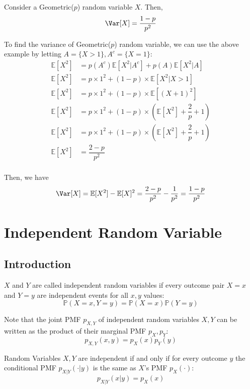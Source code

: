 Consider a Geometric(\(p\)) random variable \(X\). Then,
\[
    \Var[X] = \dfrac{1 - p}{p^{2}}
\]

\newpage
To find the variance of Geometric(\(p\)) random variable, we can use the above example by letting \(A = \{X > 1\}, A^c = \{X = 1\}\):
\[
\begin{aligned}
    \mathbb{E}[X^2] &= p(A^c)\mathbb{E}[X^2 \vert A^c] + p(A)\mathbb{E}[X^2 \vert A] \\
    \mathbb{E}[X^2] &= p \times 1^2 + (1 - p) \times \mathbb{E}[X^2 \vert X > 1] \\
    \mathbb{E}[X^2] &= p \times 1^2 + (1 - p) \times \mathbb{E}[(X + 1)^2] \\
    \mathbb{E}[X^2] &= p \times 1^2 + (1 - p) \times (\mathbb{E}[X^2] + \dfrac{2}{p} + 1) \\
    \mathbb{E}[X^2] &= p \times 1^2 + (1 - p) \times (\mathbb{E}[X^2] + \dfrac{2}{p} + 1) \\
    \mathbb{E}[X^2] &= \dfrac{2 - p}{p^2} \\
\end{aligned}
\]

Then, we have 
\[
    \Var[X] = \mathbb{E}[X^2] - \mathbb{E}[X]^2 = \dfrac{2 - p}{p^2} - \dfrac{1}{p^2} = \dfrac{1 - p}{p^{2}}
\]

\section{Independent Random Variable}
\subsection{Introduction}
\begin{definition}
    \(X\) and \(Y\) are called independent random variables if every outcome pair \(X = x\) and \(Y = y\) are independent events for all \(x, y\) values: 
    \[
        \mathbb{P}(X = x, Y = y) = \mathbb{P}(X = x)\mathbb{P}(Y = y)
    \]

    \begin{remark}
        Note that the joint PMF \(p_{X, Y}\)  of independent random variables \(X, Y\) can be written as the product of their marginal PMF \(p_X, p_Y\): 
        \[
            p_{X, Y}(x, y) = p_X(x)p_Y(y)
        \]
    \end{remark}
\end{definition}

Random Variables \(X, Y\) are independent if and only if for every outcome \(y\)  the conditional PMF \(p_{X \vert Y} (\cdot \vert y)\) is the same as \(X\)’s PMF \(p_X (\cdot)\): 
\[
    p_{X \vert Y} (x \vert y) = p_X(x)
\]

